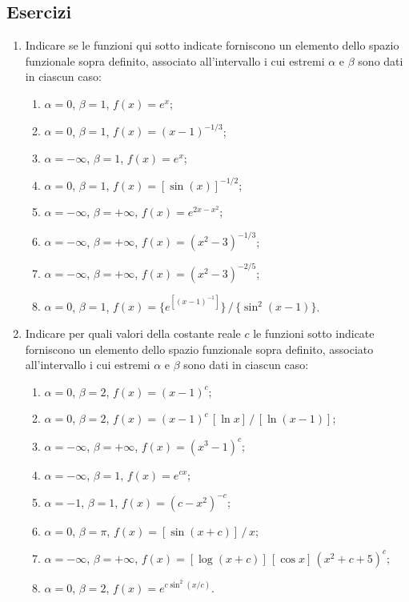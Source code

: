 \documentclass[11pt, a4paper]{book}
\numberwithin{equation}{section}
\newenvironment{esercizi}{\subsection*{Esercizi}\begin{enumerate}}{\end{enumerate}}
\begin{document}
\begin{esercizi}

\item Indicare se le funzioni qui sotto indicate forniscono un elemento
dello spazio funzionale sopra definito, associato all'intervallo i cui
estremi $\alpha$ e $\beta$ sono dati in ciascun caso:
\begin{enumerate}
  \item $\alpha=0$, $\beta=1$, $f(x) = e^x$;
  \item $\alpha=0$, $\beta=1$, $f(x) = (x-1)^{-1/3}$;
  \item $\alpha=-\infty$, $\beta=1$, $f(x) = e^x$;
  \item $\alpha=0$, $\beta=1$, $f(x) = [\sin(x)]^{-1/2}$; %
  \item $\alpha=-\infty$, $\beta=+\infty$, $f(x) = e^{2x-x^2}$;
  \item $\alpha=-\infty$, $\beta=+\infty$, $f(x) = (x^2-3)^{-1/3}$;
  \item $\alpha=-\infty$, $\beta=+\infty$, $f(x) = (x^2-3)^{-2/5}$;
  \item $\alpha=0$, $\beta=1$, $f(x) = \bigl\{e^{[(x-1)^{-1}]}\bigr\}\,/\,\{\sin^2(x-1)\}$.
\end{enumerate}

\item Indicare per quali valori della costante reale $c$ le funzioni
sotto indicate forniscono un elemento dello spazio funzionale sopra
definito, associato all'intervallo i cui estremi $\alpha$ e $\beta$ sono
dati in ciascun caso:
\begin{enumerate}
  \item $\alpha=0$, $\beta=2$, $f(x) = (x-1)^c$;
  \item $\alpha=0$, $\beta=2$, $f(x) = (x-1)^c\,[\ln x]\,/\,[\ln(x-1)]$;
  \item $\alpha=-\infty$, $\beta=+\infty$, $f(x) = (x^3-1)^c$;
  \item $\alpha=-\infty$, $\beta=1$, $f(x) = e^{cx}$;
  \item $\alpha=-1$, $\beta=1$, $f(x) = (c-x^2)^{-c}$;
  \item $\alpha=0$, $\beta=\pi$, $f(x) = [\sin(x+c)]\,/\,x$;
  \item $\alpha=-\infty$, $\beta=+\infty$, $f(x) = [\log(x+c)]\,[\cos x]\,(x^2+c+5)^c$;
  \item $\alpha=0$, $\beta=2$, $f(x) = e^{c\sin^2(x/c)}$.
\end{enumerate}


\end{esercizi}
\end{document}
